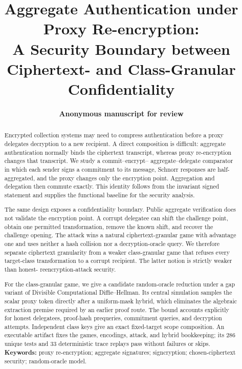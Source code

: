 \documentclass[11pt,letterpaper]{article}
\title{Aggregate Authentication under Proxy Re-encryption:\\
A Security Boundary between Ciphertext- and Class-Granular Confidentiality}
\author{\textbf{Anonymous manuscript for review}}
\date{}
\theoremstyle{definition}
\theoremstyle{remark}
\begin{document}
\begin{titlepage}
\maketitle

\begin{abstract}
Encrypted collection systems may need to compress authentication before a proxy
delegates decryption to a new recipient.  A direct composition is difficult:
aggregate authentication normally binds the ciphertext transcript, whereas
proxy re-encryption changes that transcript.  We study a commit--encrypt--
aggregate--delegate comparator in which each sender signs a commitment to its
message, Schnorr responses are half-aggregated, and the proxy changes only the
encryption point.  Aggregation and delegation then commute exactly.  This
identity follows from the invariant signed statement and supplies the functional
baseline for the security analysis.

The same design exposes a confidentiality boundary.  Public aggregate
verification does not validate the encryption point.  A corrupt delegatee can
shift the challenge point, obtain one permitted transformation, remove the known
shift, and recover the challenge opening.  The attack wins a natural
ciphertext-granular game with advantage one and uses neither a hash collision nor
a decryption-oracle query.  We therefore separate ciphertext granularity from a
weaker class-granular game that refuses every target-class transformation to a
corrupt recipient.  The latter notion is strictly weaker than honest-
reencryption-attack security.

For the class-granular game, we give a candidate random-oracle reduction under a
gap variant of Divisible Computational Diffie--Hellman.  Its central simulation
samples the scalar proxy token directly after a uniform-mask hybrid, which
eliminates the algebraic extraction premise required by an earlier proof route.
The bound accounts explicitly for honest delegatees, proof-hash prequeries,
commitment queries, and decryption attempts.  Independent class keys give an
exact fixed-target scope composition.  An executable artifact fixes the games,
encodings, attack, and hybrid bookkeeping; its 286 unique tests and 33
deterministic trace replays pass without failures or skips.
\medskip
\noindent\textbf{Keywords:} proxy re-encryption; aggregate signatures;
signcryption; chosen-ciphertext security; random-oracle model.
\end{abstract}
\end{titlepage}
\end{document}
